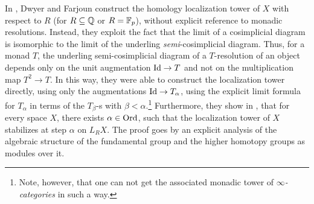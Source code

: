 \documentclass[english]{article}
\begin{document}
In \cite{dror1977long}, Dwyer and Farjoun construct the homology localization tower of $X$ with respect to $R$ (for $R\subseteq \mathbb{Q}$ or $R=\mathbb{F}_p$), without explicit reference to monadic resolutions. Instead, they exploit the fact that the limit of a cosimplicial diagram is isomorphic to the limit of the underling \textit{semi}-cosimplicial diagram. Thus, for a monad $T$, the underling semi-cosimplicial diagram of a $T$-resolution of an object depends only on the unit augmentation $\mathrm{Id} \to T$ and not on the multiplication map $T^2\to T$. In this way, they were able to construct the localization tower directly, using only the augmentations $\mathrm{Id} \to T_\alpha$, using the explicit limit formula for $T_\alpha$ in terms of the $T_\beta$-s with $\beta<\alpha$.\footnote{Note, however, that one can not get the associated monadic tower of \textit{$\infty$-categories} in such a way.} Furthermore, they show in \cite[Proposition 1.2]{dror1977long}, that for every space $X$, there exists $\alpha \in \mathrm{Ord}$, such that the localization tower of $X$ stabilizes at step $\alpha$ on $L_R X$. The proof goes by an explicit analysis of the algebraic structure of the fundamental group and the higher homotopy groups as modules over it.



\end{document}
